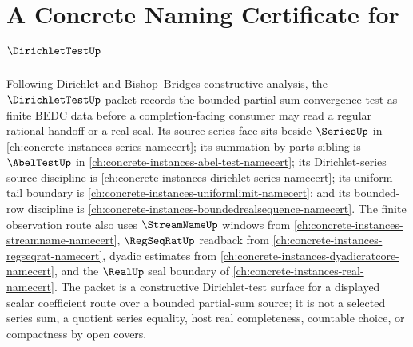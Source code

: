 \chapter{A Concrete Naming Certificate for $\DirichletTestUp$}
\label{ch:concrete-instances-dirichlet-test-namecert}

Following Dirichlet and Bishop--Bridges constructive analysis, the $\DirichletTestUp$ packet records the bounded-partial-sum convergence test as finite BEDC data before a completion-facing consumer may read a regular rational handoff or a real seal. Its source series face sits beside $\SeriesUp$ in \autoref{ch:concrete-instances-series-namecert}; its summation-by-parts sibling is $\AbelTestUp$ in \autoref{ch:concrete-instances-abel-test-namecert}; its Dirichlet-series source discipline is \autoref{ch:concrete-instances-dirichlet-series-namecert}; its uniform tail boundary is \autoref{ch:concrete-instances-uniformlimit-namecert}; and its bounded-row discipline is \autoref{ch:concrete-instances-boundedrealsequence-namecert}. The finite observation route also uses $\StreamNameUp$ windows from \autoref{ch:concrete-instances-streamname-namecert}, $\RegSeqRatUp$ readback from \autoref{ch:concrete-instances-regseqrat-namecert}, dyadic estimates from \autoref{ch:concrete-instances-dyadicratcore-namecert}, and the $\RealUp$ seal boundary of \autoref{ch:concrete-instances-real-namecert}. The packet is a constructive Dirichlet-test surface for a displayed scalar coefficient route over a bounded partial-sum source; it is not a selected series sum, a quotient series equality, host real completeness, countable choice, or compactness by open covers.

